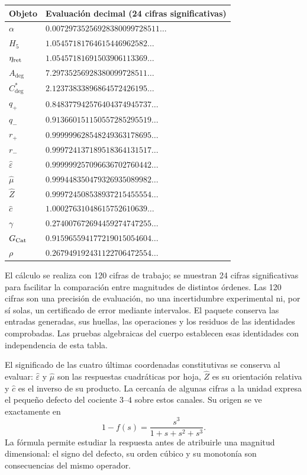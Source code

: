 \begin{longtable}{@{}ll@{}}
\toprule
Objeto & Evaluación decimal (24 cifras significativas)\\
\midrule\endhead
$\alpha$ & $0.00729735256928380099728511\ldots$ \\
$H_5$ & $1.05457181764615446962582\ldots$ \\
$\eta_{\rm ret}$ & $1.05457181691503906113369\ldots$ \\
$A_{\deg}$ & $7.29735256928380099728511\ldots$ \\
$C^*_{\deg}$ & $2.12373833896864572426195\ldots$ \\
$q_+$ & $0.848377942576404374945737\ldots$ \\
$q_-$ & $0.913660151150557285295519\ldots$ \\
$r_+$ & $0.999999628548249363178695\ldots$ \\
$r_-$ & $0.999724137189518364131517\ldots$ \\
$\widehat\varepsilon$ & $0.999999257096636702760442\ldots$ \\
$\widehat\mu$ & $0.999448350479326935089982\ldots$ \\
$\widehat Z$ & $0.999724508538937215455554\ldots$ \\
$\widehat c$ & $1.00027631048615752610639\ldots$ \\
$\gamma$ & $0.274007672694459274747255\ldots$ \\
$G_{\rm Cat}$ & $0.915965594177219015054604\ldots$ \\
$\rho$ & $0.267949192431122706472554\ldots$ \\
\bottomrule
\end{longtable}



El cálculo se realiza con 120 cifras de trabajo; se muestran 24 cifras
significativas para facilitar la comparación entre magnitudes de distintos
órdenes. Las 120 cifras son una precisión de evaluación, no una incertidumbre
experimental ni, por sí solas, un certificado de error mediante intervalos.
El paquete conserva las entradas generadas, sus huellas, las operaciones y
los residuos de las identidades comprobadas. Las pruebas algebraicas del
cuerpo establecen esas identidades con independencia de esta tabla.

El significado de las cuatro últimas coordenadas constitutivas se conserva
al evaluar: $\widehat\varepsilon$ y $\widehat\mu$ son las respuestas
cuadráticas por hoja, $\widehat Z$ es su orientación relativa y
$\widehat c$ es el inverso de su producto. La cercanía de algunas cifras a
la unidad expresa el pequeño defecto del cociente $3$--$4$ sobre estos
canales. Su origen se ve exactamente en
\[
 1-f(s)=\frac{s^3}{1+s+s^2+s^3}.
\]
La fórmula permite estudiar la respuesta antes de atribuirle una magnitud
dimensional: el signo del defecto, su orden cúbico y su monotonía son
consecuencias del mismo operador.

